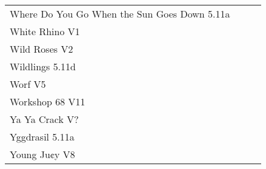 \begin{flushleft}
\begin{center}
\begin{supertabular}{p{0.76\linewidth}p{0.08\linewidth}}
Where Do You Go When the Sun Goes Down 5.11a & \pageref{rt:Where Do You Go When the Sun Goes Down} \\
White Rhino V1 & \pageref{rt:White Rhino} \\
Wild Roses V2 & \pageref{rt:Wild Roses} \\
Wildlings 5.11d & \pageref{rt:Wildlings} \\
Worf V5 & \pageref{rt:Worf} \\
Workshop 68 V11 & \pageref{vr:Workshop 68} \\
Ya Ya Crack V? & \pageref{rt:Ya Ya Crack} \\
Yggdrasil 5.11a & \pageref{rt:Yggdrasil} \\
Young Ju¢y V8 & \pageref{rt:Young Ju¢y} \\
\end{supertabular}
\end{center}
\needspace{1.5cm}

\end{flushleft}
